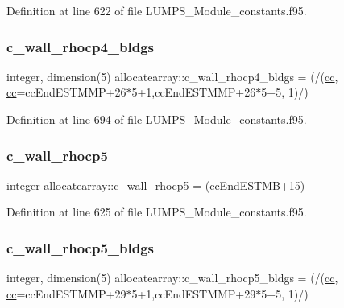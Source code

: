 Definition at line 622 of file L\+U\+M\+P\+S\+\_\+\+Module\+\_\+constants.\+f95.

\mbox{\label{namespaceallocatearray_ae0bee70a024e2e4204e3c0e2ea43fe0c}} 
\subsubsection{\texorpdfstring{c\+\_\+wall\+\_\+rhocp4\+\_\+bldgs}{c\_wall\_rhocp4\_bldgs}}
{\footnotesize\ttfamily integer, dimension(5) allocatearray\+::c\+\_\+wall\+\_\+rhocp4\+\_\+bldgs = (/(\hyperlink{namespaceallocatearray_ac863c81704eb507dee10f5e10741e10c}{cc}, \hyperlink{namespaceallocatearray_ac863c81704eb507dee10f5e10741e10c}{cc}=cc\+End\+E\+S\+T\+M\+MP+26$\ast$5+1,cc\+End\+E\+S\+T\+M\+MP+26$\ast$5+5, 1)/)}



Definition at line 694 of file L\+U\+M\+P\+S\+\_\+\+Module\+\_\+constants.\+f95.

\mbox{\label{namespaceallocatearray_a37f84d7ca6d321296dc94474f3083069}} 
\subsubsection{\texorpdfstring{c\+\_\+wall\+\_\+rhocp5}{c\_wall\_rhocp5}}
{\footnotesize\ttfamily integer allocatearray\+::c\+\_\+wall\+\_\+rhocp5 = (cc\+End\+E\+S\+T\+MB+15)}



Definition at line 625 of file L\+U\+M\+P\+S\+\_\+\+Module\+\_\+constants.\+f95.

\mbox{\label{namespaceallocatearray_a9fd17628369d7e612fbb9190cf2c92f2}} 
\subsubsection{\texorpdfstring{c\+\_\+wall\+\_\+rhocp5\+\_\+bldgs}{c\_wall\_rhocp5\_bldgs}}
{\footnotesize\ttfamily integer, dimension(5) allocatearray\+::c\+\_\+wall\+\_\+rhocp5\+\_\+bldgs = (/(\hyperlink{namespaceallocatearray_ac863c81704eb507dee10f5e10741e10c}{cc}, \hyperlink{namespaceallocatearray_ac863c81704eb507dee10f5e10741e10c}{cc}=cc\+End\+E\+S\+T\+M\+MP+29$\ast$5+1,cc\+End\+E\+S\+T\+M\+MP+29$\ast$5+5, 1)/)}



